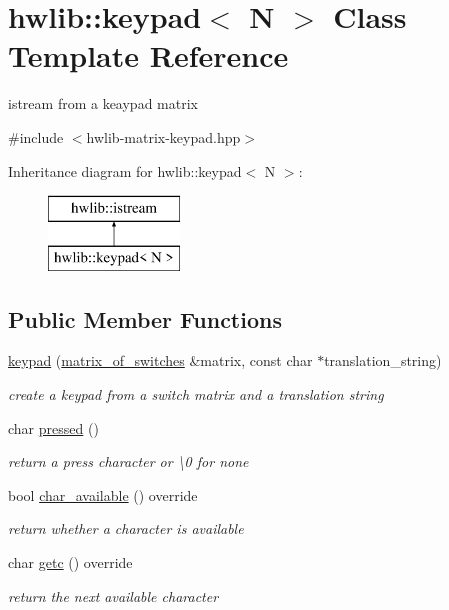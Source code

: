 \hypertarget{classhwlib_1_1keypad}{}\section{hwlib\+:\+:keypad$<$ N $>$ Class Template Reference}
\label{classhwlib_1_1keypad}


istream from a keaypad matrix  




{\ttfamily \#include $<$hwlib-\/matrix-\/keypad.\+hpp$>$}

Inheritance diagram for hwlib\+:\+:keypad$<$ N $>$\+:\begin{figure}[H]
\begin{center}
\leavevmode
\includegraphics[height=2.000000cm]{classhwlib_1_1keypad}
\end{center}
\end{figure}
\subsection*{Public Member Functions}
\begin{DoxyCompactItemize}
\item 
\hyperlink{classhwlib_1_1keypad_a6bb965d7739192e6868a392697b6863c}{keypad} (\hyperlink{classhwlib_1_1matrix__of__switches}{matrix\+\_\+of\+\_\+switches} \&matrix, const char $\ast$translation\+\_\+string)
\begin{DoxyCompactList}\small\item\em create a keypad from a switch matrix and a translation string \end{DoxyCompactList}\item 
char \hyperlink{classhwlib_1_1keypad_a34f0f6c0cea1702e84b9f20a9379d8a8}{pressed} ()
\begin{DoxyCompactList}\small\item\em return a press character or \textquotesingle{}\textbackslash{}0\textquotesingle{} for none \end{DoxyCompactList}\item 
bool \hyperlink{classhwlib_1_1keypad_a9bef86eba2e6ac84c014a1577f44cd9c}{char\+\_\+available} () override
\begin{DoxyCompactList}\small\item\em return whether a character is available \end{DoxyCompactList}\item 
char \hyperlink{classhwlib_1_1keypad_aa2a2ab2fca1de5daa5587b3433c8e74a}{getc} () override
\begin{DoxyCompactList}\small\item\em return the next available character \end{DoxyCompactList}\end{DoxyCompactItemize}


